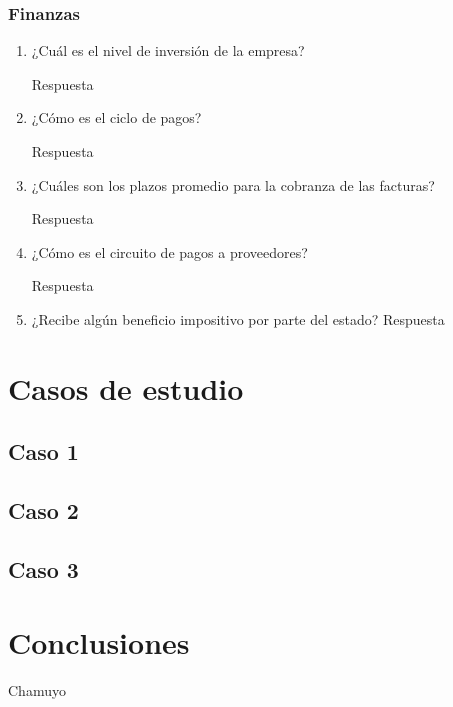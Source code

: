 \documentclass[a4paper,10pt]{article}
\begin{document}
			
		\subsubsection{Finanzas}
		
		
			\begin{enumerate}[resume]

			\item ¿Cuál es el nivel de inversión de la empresa?
			
			Respuesta
			
			\item ¿Cómo es el ciclo de pagos?

			Respuesta
			
			\item ¿Cuáles son los plazos promedio para la cobranza de las facturas?
			
			Respuesta
			
			\item ¿Cómo es el circuito de pagos a proveedores?
			
			Respuesta
			
			\item ¿Recibe algún beneficio impositivo por parte del estado?
			Respuesta
			
			\end{enumerate}
\section{Casos de estudio}
	\subsection{Caso 1}
	\subsection{Caso 2}
	\subsection{Caso 3}
	
\section{Conclusiones}
Chamuyo

\begin{comment}
\begin{thebibliography}{99}

\bibitem{INT06} Intel Technology \& Research, ``Hyper-Threading Technology,'' 2006, http://www.intel.com/technology/hyperthread/.

\bibitem{HEN00} J. L. Hennessy and D. A. Patterson, ``Computer Architecture. A Quantitative
Approach,'' 3ra Edición, Morgan Kaufmann Publishers, 2000.

\bibitem{LAR92} J. Larus and T. Ball, ``Rewriting Executable Files to Mesure Program Behavior,'' Tech. Report 1083, Univ. of Wisconsin, 1992.

\end{thebibliography}
\end{comment}
\end{document}
